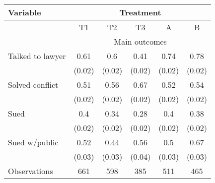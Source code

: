 \begin{tabular}{lccccc}
\toprule
Variable & \multicolumn{5}{c}{Treatment} \\
\midrule
\midrule
      & T1    & T2    & T3    & A     & B \\
\midrule
      & \multicolumn{5}{c}{Main outcomes} \\
\midrule
\midrule
Talked to lawyer & 0.61  & 0.6   & 0.41  & 0.74  & 0.78 \\
      & (0.02) & (0.02) & (0.02) & (0.02) & (0.02) \\
Solved conflict & 0.51  & 0.56  & 0.67  & 0.52  & 0.54 \\
      & (0.02) & (0.02) & (0.02) & (0.02) & (0.02) \\
Sued  & 0.4   & 0.34  & 0.28  & 0.4   & 0.38 \\
      & (0.02) & (0.02) & (0.02) & (0.02) & (0.02) \\
Sued w/public & 0.52  & 0.44  & 0.56  & 0.5   & 0.67 \\
      & (0.03) & (0.03) & (0.04) & (0.03) & (0.03) \\
\midrule
Observations & 661   & 598   & 385   & 511   & 465 \\
\bottomrule
\bottomrule
\end{tabular}%
